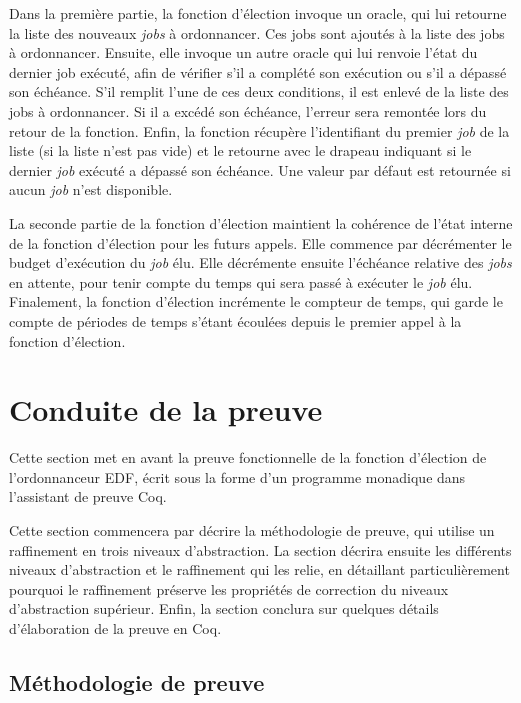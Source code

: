 		Dans la première partie, la fonction d'élection invoque un oracle, qui lui retourne la liste des nouveaux \emph{jobs} à ordonnancer. Ces jobs sont ajoutés à la liste des jobs à ordonnancer. Ensuite, elle invoque un autre oracle qui lui renvoie l'état du dernier job exécuté, afin de vérifier s'il a complété son exécution ou s'il a dépassé son échéance. S'il remplit l'une de ces deux conditions, il est enlevé de la liste des jobs à ordonnancer. Si il a excédé son échéance, l'erreur sera remontée lors du retour de la fonction. Enfin, la fonction récupère l'identifiant du premier \emph{job} de la liste (si la liste n'est pas vide) et le retourne avec le drapeau indiquant si le dernier \emph{job} exécuté a dépassé son échéance. Une valeur par défaut est retournée si aucun \emph{job} n'est disponible.

		La seconde partie de la fonction d'élection maintient la cohérence de l'état interne de la fonction d'élection pour les futurs appels. Elle commence par décrémenter le budget d'exécution du \emph{job} élu. Elle décrémente ensuite l'échéance relative des \emph{jobs} en attente, pour tenir compte du temps qui sera passé à exécuter le \emph{job} élu. Finalement, la fonction d'élection incrémente le compteur de temps, qui garde le compte de périodes de temps s'étant écoulées depuis le premier appel à la fonction d'élection.

	\section{Conduite de la preuve}

	\label{sec:proof}
	Cette section met en avant la preuve fonctionnelle de la fonction d'élection de l'ordonnanceur EDF, écrit sous la forme d'un programme monadique dans l'assistant de preuve Coq.

	Cette section commencera par décrire la méthodologie de preuve, qui utilise un raffinement en trois niveaux d'abstraction. La section décrira ensuite les différents niveaux d'abstraction et le raffinement qui les relie, en détaillant particulièrement pourquoi le raffinement préserve les propriétés de correction du niveaux d'abstraction supérieur. Enfin, la section conclura sur quelques détails d'élaboration de la preuve en Coq.

	\subsection{Méthodologie de preuve}

